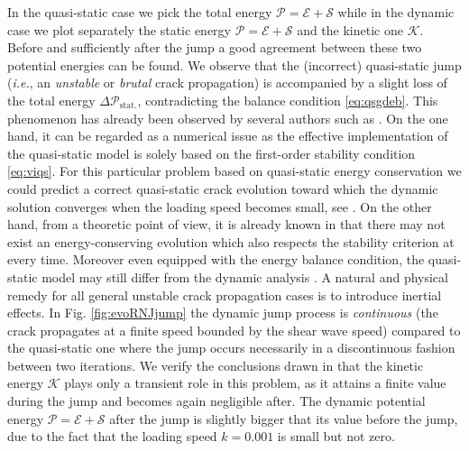 In the quasi-static case we pick the total energy $\mathcal{P}=\mathcal{E}+\mathcal{S}$ while in the dynamic case we plot separately the static energy $\mathcal{P}=\mathcal{E}+\mathcal{S}$ and the kinetic one $\mathcal{K}$. Before and sufficiently after the jump a good agreement between these two potential energies can be found. We observe that the (incorrect) quasi-static jump (\emph{i.e.}, an \emph{unstable} or \emph{brutal} crack propagation) is accompanied by a slight loss of the total energy $\Delta \mathcal{P}_\mathrm{stat.}$, contradicting the balance condition \eqref{eq:qsgdeb}. This phenomenon has already been observed by several authors such as \cite{BourdinFrancfortMarigo:2008,AmorMarigoMaurini:2009,PhamAmorMarigoMaurini:2011,Bourdin:2011}. On the one hand, it can be regarded as a numerical issue as the effective implementation of the quasi-static model is solely based on the first-order stability condition \eqref{eq:viqs}. For this particular problem based on quasi-static energy conservation we could predict a correct quasi-static crack evolution toward which the dynamic solution converges when the loading speed becomes small, see \cite{DumouchelMarigoCharlotte:2008}. On the other hand, from a theoretic point of view, it is already known in \cite{Pham:2010} that there may not exist an energy-conserving evolution which also respects the stability criterion at every time. Moreover even equipped with the energy balance condition, the quasi-static model may still differ from the dynamic analysis \cite{LazzaroniBargelliniDumouchelMarigo:2012}. A natural and physical remedy for all general unstable crack propagation cases is to introduce inertial effects. In Fig. \ref{fig:evoRNJjump} the dynamic jump process is \emph{continuous} (the crack propagates at a finite speed bounded by the shear wave speed) compared to the quasi-static one where the jump occurs necessarily in a discontinuous fashion between two iterations. We verify the conclusions drawn in \cite{DumouchelMarigoCharlotte:2008} that the kinetic energy $\mathcal{K}$ plays only a transient role in this problem, as it attains a finite value during the jump and becomes again negligible after. The dynamic potential energy $\mathcal{P}=\mathcal{E}+\mathcal{S}$ after the jump is slightly bigger that its value before the jump, due to the fact that the loading speed $k=0.001$ is small but not zero.

